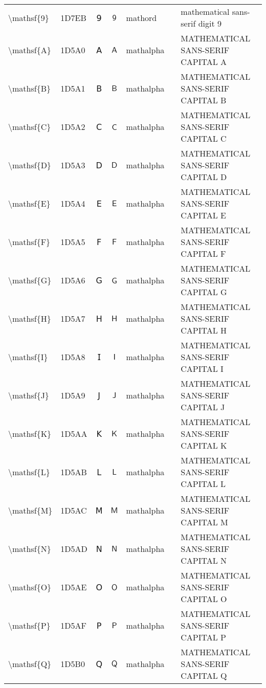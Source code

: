 \documentclass[a4paper,landscape]{article}
\begin{document}
\begin{longtable}{llcclll}
\textbackslash{}mathsf\{9\} & 1D7EB & 𝟫 & $\mathsf{9}$ & mathord &  & mathematical sans-serif digit 9 \\
\textbackslash{}mathsf\{A\} & 1D5A0 & 𝖠 & $\mathsf{A}$ & mathalpha &  & MATHEMATICAL SANS-SERIF CAPITAL A \\
\textbackslash{}mathsf\{B\} & 1D5A1 & 𝖡 & $\mathsf{B}$ & mathalpha &  & MATHEMATICAL SANS-SERIF CAPITAL B \\
\textbackslash{}mathsf\{C\} & 1D5A2 & 𝖢 & $\mathsf{C}$ & mathalpha &  & MATHEMATICAL SANS-SERIF CAPITAL C \\
\textbackslash{}mathsf\{D\} & 1D5A3 & 𝖣 & $\mathsf{D}$ & mathalpha &  & MATHEMATICAL SANS-SERIF CAPITAL D \\
\textbackslash{}mathsf\{E\} & 1D5A4 & 𝖤 & $\mathsf{E}$ & mathalpha &  & MATHEMATICAL SANS-SERIF CAPITAL E \\
\textbackslash{}mathsf\{F\} & 1D5A5 & 𝖥 & $\mathsf{F}$ & mathalpha &  & MATHEMATICAL SANS-SERIF CAPITAL F \\
\textbackslash{}mathsf\{G\} & 1D5A6 & 𝖦 & $\mathsf{G}$ & mathalpha &  & MATHEMATICAL SANS-SERIF CAPITAL G \\
\textbackslash{}mathsf\{H\} & 1D5A7 & 𝖧 & $\mathsf{H}$ & mathalpha &  & MATHEMATICAL SANS-SERIF CAPITAL H \\
\textbackslash{}mathsf\{I\} & 1D5A8 & 𝖨 & $\mathsf{I}$ & mathalpha &  & MATHEMATICAL SANS-SERIF CAPITAL I \\
\textbackslash{}mathsf\{J\} & 1D5A9 & 𝖩 & $\mathsf{J}$ & mathalpha &  & MATHEMATICAL SANS-SERIF CAPITAL J \\
\textbackslash{}mathsf\{K\} & 1D5AA & 𝖪 & $\mathsf{K}$ & mathalpha &  & MATHEMATICAL SANS-SERIF CAPITAL K \\
\textbackslash{}mathsf\{L\} & 1D5AB & 𝖫 & $\mathsf{L}$ & mathalpha &  & MATHEMATICAL SANS-SERIF CAPITAL L \\
\textbackslash{}mathsf\{M\} & 1D5AC & 𝖬 & $\mathsf{M}$ & mathalpha &  & MATHEMATICAL SANS-SERIF CAPITAL M \\
\textbackslash{}mathsf\{N\} & 1D5AD & 𝖭 & $\mathsf{N}$ & mathalpha &  & MATHEMATICAL SANS-SERIF CAPITAL N \\
\textbackslash{}mathsf\{O\} & 1D5AE & 𝖮 & $\mathsf{O}$ & mathalpha &  & MATHEMATICAL SANS-SERIF CAPITAL O \\
\textbackslash{}mathsf\{P\} & 1D5AF & 𝖯 & $\mathsf{P}$ & mathalpha &  & MATHEMATICAL SANS-SERIF CAPITAL P \\
\textbackslash{}mathsf\{Q\} & 1D5B0 & 𝖰 & $\mathsf{Q}$ & mathalpha &  & MATHEMATICAL SANS-SERIF CAPITAL Q \\

\end{longtable}
\end{document}

